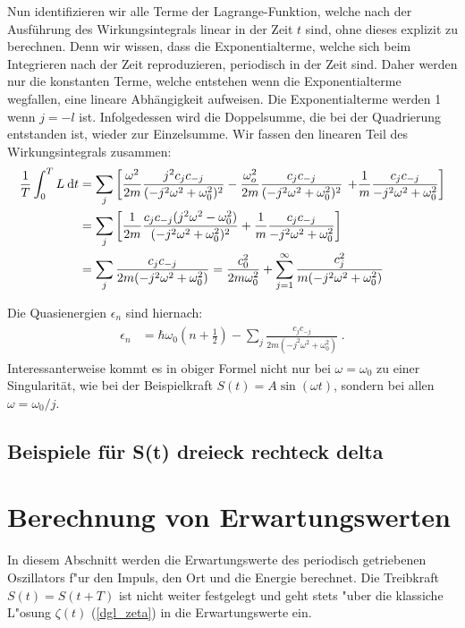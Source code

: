    Nun identifizieren wir alle Terme der Lagrange-Funktion, welche nach der Ausführung des Wirkungsintegrals linear in der Zeit $t$ sind, ohne dieses explizit zu berechnen.
   Denn wir wissen, dass die Exponentialterme, welche sich beim Integrieren nach der Zeit reproduzieren, periodisch in der Zeit sind.
   Daher werden nur die konstanten Terme, welche entstehen wenn die Exponentialterme wegfallen, eine lineare Abhängigkeit aufweisen.
   Die Exponentialterme werden 1 wenn $j=-l$ ist.
   Infolgedessen wird die Doppelsumme, die bei der Quadrierung entstanden ist, wieder zur Einzelsumme.
   Wir fassen den linearen Teil des Wirkungsintegrals zusammen:
   \begin{align}
     \begin{split}
       \frac{1}{T} \int_0^T L \: \text d t
       &= \sum_j \left[\frac{\omega^2}{2m} \frac{j^2c_jc_{-j}}{(-j^2\omega^2+\omega_0^2)^2}
       - \frac{\omega_o^2}{2m} \frac{c_jc_{-j}}{(-j^2\omega^2+\omega_0^2)^2} \right.
       \left. +\frac{1}{m} \frac{c_jc_{-j}}{-j^2\omega^2+\omega_0^2}
       \right]\\
       &= \sum_j \left[\frac{1}{2m} \frac{c_jc_{-j}(j^2\omega^2-\omega_0^2)}{(-j^2\omega^2+\omega_0^2)^2} + \frac{1}{m} \frac{c_jc_{-j}}{-j^2\omega^2+\omega_0^2} \right] \\
       &= \sum_j \frac{c_jc_{-j}}{2m(-j^2\omega^2+\omega_0^2)} = \frac{c_0^2}{2m\omega_0^2} + \sum_{j=1}^\infty \frac{c_j^2}{m(-j^2\omega^2+\omega_0^2)}
     \end{split}
   \end{align}

   Die Quasienergien $\epsilon_n$ sind hiernach:
   \begin{align}
     \begin{split}
       \epsilon_n &= \hbar \omega_0\left(n+\frac{1}{2}\right) - \sum_j \frac{c_jc_{-j}}{2m(-j^2\omega^2+\omega_0^2)} \; .
     \end{split}
   \end{align}
   Interessanterweise kommt es in obiger Formel nicht nur bei $\omega = \omega_0$ zu einer Singularität, wie bei der Beispielkraft $S(t) = A\sin(\omega t)$, sondern bei allen $\omega = \omega_0 / j$.



   \subsection{Beispiele für S(t) dreieck rechteck delta}

\section{Berechnung von Erwartungswerten}
  In diesem Abschnitt werden die Erwartungswerte des periodisch getriebenen Oszillators f"ur den Impuls, den Ort und die Energie berechnet.
  Die Treibkraft $S(t)=S(t+T)$ ist nicht weiter festgelegt und geht stets "uber die klassiche L"osung $\zeta(t)$ (\ref{dgl_zeta}) in die Erwartungswerte ein.

